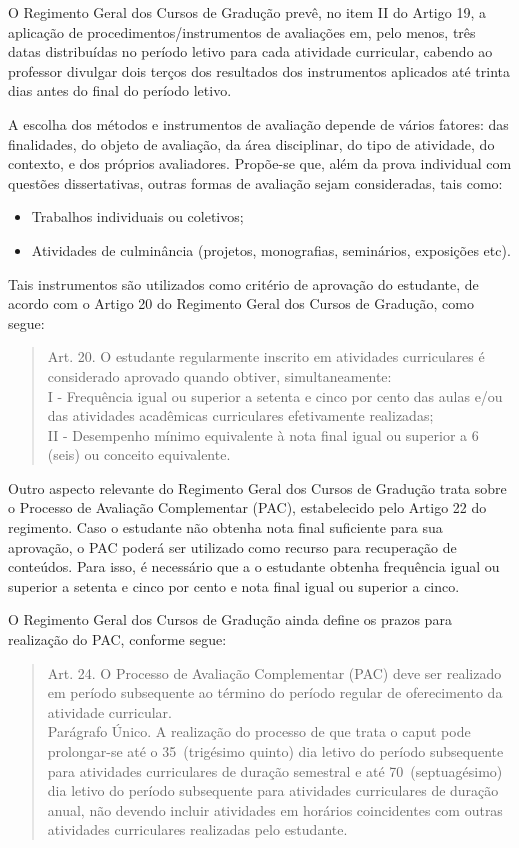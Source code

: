O Regimento Geral dos Cursos de Gradução prevê, no item II do Artigo 19, a aplicação de procedimentos/instrumentos de avaliações em, pelo menos, três datas distribuídas no período letivo para cada atividade curricular, cabendo ao professor divulgar dois terços dos resultados dos instrumentos aplicados até trinta dias antes do final do período letivo.

A escolha dos métodos e instrumentos de avaliação depende de vários fatores: das finalidades, do objeto de avaliação, da área disciplinar, do tipo de atividade, do contexto, e dos próprios avaliadores. Propõe-se que, além da prova individual com questões dissertativas, outras formas de avaliação sejam consideradas, tais como:

\begin{itemize}
\item Trabalhos individuais ou coletivos;
\item Atividades de culminância (projetos, monografias, seminários, exposições etc).
\end{itemize}

Tais instrumentos são utilizados como critério de aprovação do estudante, de acordo com o Artigo 20 do Regimento Geral dos Cursos de Gradução, como segue:

\begin{quote}
Art. 20. O estudante regularmente inscrito em atividades curriculares é considerado aprovado quando obtiver, simultaneamente:\\
I - Frequência igual ou superior a setenta e cinco por cento das aulas e/ou das atividades acadêmicas curriculares efetivamente realizadas;\\
II - Desempenho mínimo equivalente à nota final igual ou superior a 6 (seis) ou conceito equivalente. 
\end{quote}

Outro aspecto relevante do Regimento Geral dos Cursos de Gradução trata sobre o Processo de Avaliação Complementar (PAC), estabelecido pelo Artigo 22 do regimento. Caso o estudante não obtenha nota final suficiente para sua aprovação, o PAC poderá ser utilizado como recurso para recuperação de conteúdos. Para isso, é necessário que a o estudante obtenha frequência igual ou superior a setenta e cinco por cento e nota final igual ou superior a cinco.

O Regimento Geral dos Cursos de Gradução ainda define os prazos para realização do PAC, conforme segue:

\begin{quote}
Art. 24. O Processo de Avaliação Complementar (PAC) deve ser realizado em período subsequente ao término do período regular de oferecimento da atividade curricular. \\
Parágrafo Único. A realização do processo de que trata o caput pode prolongar-se até o 35\textordmasculine~(trigésimo quinto) dia letivo do período subsequente para atividades curriculares de duração semestral e até 70\textordmasculine~(septuagésimo) dia letivo do período subsequente para atividades curriculares de duração anual, não devendo incluir atividades em horários coincidentes com outras atividades curriculares realizadas pelo estudante.
\end{quote}


